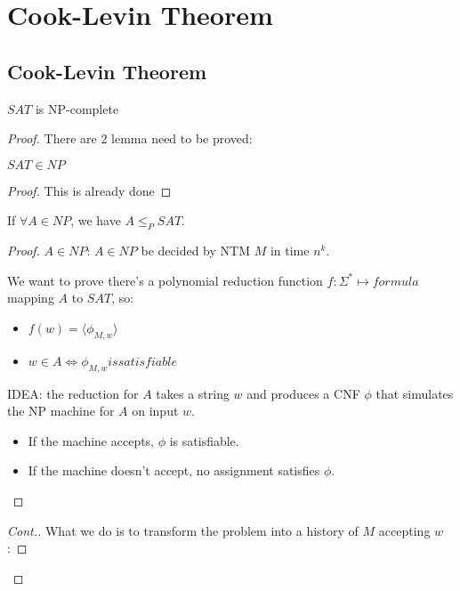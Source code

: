 \chapter{Cook-Levin Theorem}

\section{Cook-Levin Theorem}

\begin{theorem}
    \(SAT\) is NP-complete 
\end{theorem}
\begin{proof}
    There are 2 lemma need to be proved:

    \begin{lemma}[Lemma1: NP]
        \(SAT \in NP\) 
    \end{lemma}
    \begin{proof}
        This is already done
    \end{proof}

    \begin{lemma}
        If \(\forall A \in NP\), we have \(A \leq_P SAT\).  
    \end{lemma}
    \begin{proof}
        \(A \in NP\): \(A \in NP\) be decided by NTM \(M\) in time \(n^k\).   

        We want to prove there's a polynomial reduction function \(f: \Sigma^* \mapsto formula\) mapping \(A\) to \(SAT\), so:
        \begin{itemize}
            \item \(f(w) = \langle \phi_{M, w} \rangle\)
            \item \(w \in A \iff \phi_{M, w} is satisfiable\)  
        \end{itemize}

        IDEA: the reduction for \(A\) takes a string \(w\) and produces a CNF \(\phi\) that simulates the NP machine for \(A\) on input \(w\).    
        \begin{itemize}
            \item If the machine accepts, \(\phi\) is satisfiable.
            \item If the machine doesn't accept, no assignment satisfies \(\phi\).   
        \end{itemize}

    \end{proof}
    \begin{proof}[Cont.]
        What we do is to transform the problem into a history of \(M\) accepting \(w\):  


\end{proof}
\end{proof}
